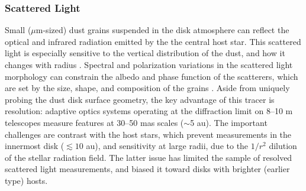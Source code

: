 \documentclass[a4paper]{ar-1col}
\begin{document}
\subsubsection{Scattered Light}
Small ($\mu$m-sized) dust grains suspended in the disk atmosphere can reflect the optical and infrared radiation emitted by the the central host star.  This scattered light is especially sensitive to the vertical distribution of the dust, and how it changes with radius \citep[e.g.,][]{debes13,stolker16,garufi17}.  Spectral and polarization variations in the scattered light morphology can constrain the albedo and phase function of the scatterers, which are set by the size, shape, and composition of the grains \citep{debes08,min12,min16}.  Aside from uniquely probing the dust disk surface geometry, the key advantage of this tracer is resolution: adaptive optics systems operating at the diffraction limit on 8--10 m telescopes measure features at 30--50 mas scales ($\sim$5 au).  The important challenges are contrast with the host stars, which prevent measurements in the innermost disk ($\lesssim 10$ au), and sensitivity at large radii, due to the $1/r^2$ dilution of the stellar radiation field.  The latter issue has limited the sample of resolved scattered light measurements, and biased it toward disks with brighter (earlier type) hosts.    

\end{document}
